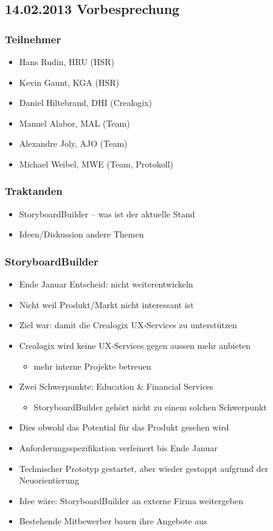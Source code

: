 \subsection*{14.02.2013 Vorbesprechung}

\subsubsection*{Teilnehmer}

\begin{itemize}
	\item Hans Rudin, HRU (HSR)
	\item Kevin Gaunt, KGA (HSR)
	\item Daniel Hiltebrand, DHI (Crealogix)
	\item Manuel Alabor, MAL (Team)
	\item Alexandre Joly, AJO (Team)
	\item Michael Weibel, MWE (Team, Protokoll)
\end{itemize}

\subsubsection*{Traktanden}
\begin{itemize}
	\item StoryboardBuilder -- was ist der aktuelle Stand
	\item Ideen/Diskussion andere Themen
\end{itemize}

\subsubsection*{StoryboardBuilder}
\begin{itemize}
	\item Ende Januar Entscheid: nicht weiterentwickeln
	\item Nicht weil Produkt/Markt nicht interessant ist
	\item Ziel war: damit die Crealogix UX-Services zu unterstützen
	\item Crealogix wird keine UX-Services gegen aussen mehr anbieten
		\begin{itemize}
			\item mehr interne Projekte betreuen
		\end{itemize}
	\item Zwei Schwerpunkte: Education \& Financial Services
		\begin{itemize}
			\item StoryboardBuilder gehört nicht zu einem solchen Schwerpunkt
		\end{itemize}
	\item Dies obwohl das Potential für das Produkt gesehen wird
	\item Anforderungsspezifikation verfeinert bis Ende Januar
	\item Technischer Prototyp gestartet, aber wieder gestoppt aufgrund der Neuorientierung
	\item Idee wäre: StoryboardBuilder an externe Firma weitergeben
	\item Bestehende Mitbewerber bauen ihre Angebote aus
\end{itemize}

